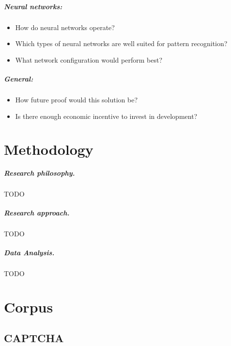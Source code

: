 \documentclass[pdftex,a4paper,12pt,twoside]{report}
\begin{document}
\paragraph{Neural networks:}
\begin{itemize}
\item How do neural networks operate?
\item Which types of neural networks are well suited for pattern recognition?
\item What network configuration would perform best?
\end{itemize}
\paragraph{General:}
\begin{itemize}
\item How future proof would this solution be?
\item Is there enough economic incentive to invest in development?
\end{itemize}
\chapter{Methodology}
\label{ch:methodology}
\paragraph{Research philosophy.}
TODO
\paragraph{Research approach.}
TODO
\paragraph{Data Analysis.}
TODO
\chapter{Corpus}
\label{ch:corpus}
\section{CAPTCHA}
\label{sec:captcha}
\end{document}
